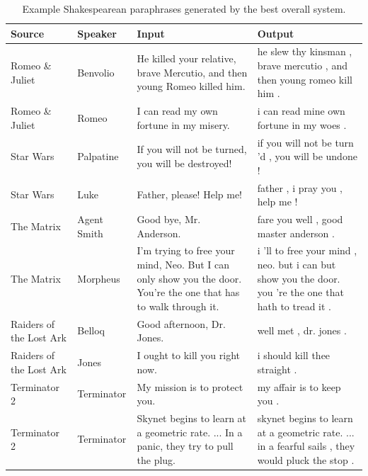 \documentclass[10pt,a5paper,twoside]{article}
\begin{document}
\begin{table}[ht]
  \begin{center}
    \begin{tabular}{|l|l|p{1.4in}|p{1.4in}|}
      \hline
      Source & Speaker & Input & Output \\
      \hline
      \hline
      Romeo \& Juliet & Benvolio & He killed your relative, brave Mercutio, and then young Romeo killed him. & he slew thy kinsman , brave mercutio , and then young romeo kill him . \\
      \hline
      Romeo \& Juliet & Romeo & I can read my own fortune in my misery. & i can read mine own fortune in my woes . \\
      \hline
      Star Wars & Palpatine & If you will not be turned, you will be destroyed! & if you will not be turn 'd , you will be undone ! \\
      \hline
      Star Wars & Luke & Father, please! Help me! & father , i pray you , help me ! \\    
      \hline
      The Matrix & Agent Smith & Good bye, Mr. Anderson. & fare you well , good master anderson . \\
      \hline
      The Matrix & Morpheus & I'm trying to free your mind, Neo. But I can only show you the door. You're the one that has to walk through it. & i 'll to free your mind , neo. but i can but show you the door. you 're the one that hath to tread it . \\
      \hline
      Raiders of the Lost Ark & Belloq & Good afternoon, Dr. Jones. & well met , dr. jones . \\
      \hline
      Raiders of the Lost Ark & Jones & I ought to kill you right now. & i should kill thee straight . \\
      \hline
      Terminator 2 & Terminator & My mission is to protect you. & my affair is to keep you . \\
      \hline
      Terminator 2 & Terminator & Skynet begins to learn at a geometric rate. ... In a panic, they try to pull the plug. & skynet begins to learn at a geometric rate. ... in a fearful sails , they would pluck the stop . \\
      \hline
    \end{tabular}
  \end{center}
  \caption{Example Shakespearean paraphrases generated by the best overall system.}
  \label{examples}
\end{table}
\end{document}
